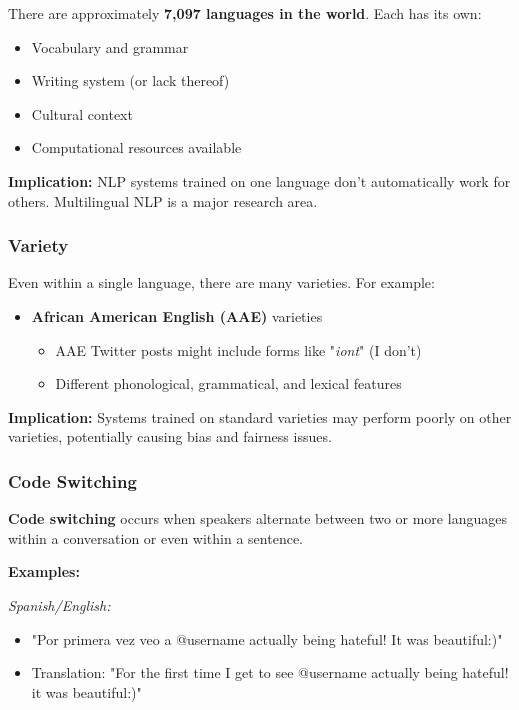 \documentclass[11pt,a4paper]{article}
\theoremstyle{definition}
\theoremstyle{plain}
\theoremstyle{remark}
\begin{document}
There are approximately \textbf{7,097 languages in the world}. Each has its own:
\begin{itemize}
    \item Vocabulary and grammar
    \item Writing system (or lack thereof)
    \item Cultural context
    \item Computational resources available
\end{itemize}

\textbf{Implication:} NLP systems trained on one language don't automatically work for others. Multilingual NLP is a major research area.

\subsubsection{Variety}

Even within a single language, there are many varieties. For example:
\begin{itemize}
    \item \textbf{African American English (AAE)} varieties
    \begin{itemize}
        \item AAE Twitter posts might include forms like "\textit{iont}" (I don't)
        \item Different phonological, grammatical, and lexical features
    \end{itemize}
\end{itemize}

\textbf{Implication:} Systems trained on standard varieties may perform poorly on other varieties, potentially causing bias and fairness issues.

\subsubsection{Code Switching}

\textbf{Code switching} occurs when speakers alternate between two or more languages within a conversation or even within a sentence.

\textbf{Examples:}

\textit{Spanish/English:}
\begin{itemize}
    \item "Por primera vez veo a @username actually being hateful! It was beautiful:)"
    \item Translation: "For the first time I get to see @username actually being hateful! it was beautiful:)"
\end{itemize}
\end{document}
